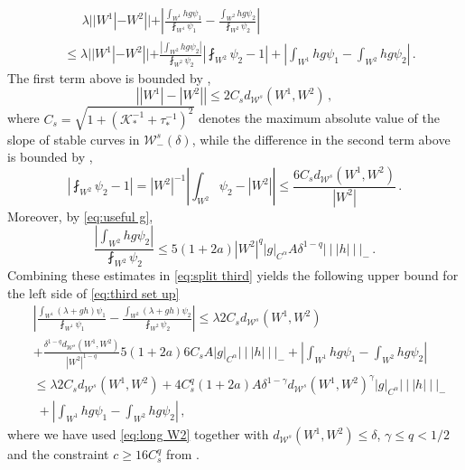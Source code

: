 \documentclass{amsart}
\numberwithin{equation}{section}
\newcommand\cK{{\mathcal K}}
\newcommand\cW{{\mathcal W}}
\newcommand{\tri}{{|\:\!\!|\:\!\!|}}
\begin{document}
\begin{equation}
\label{eq:split third}
\begin{split}
& \quad \; \, \lambda | |W^1| - W^2| | + \left| \frac{\int_{W^1} hg \psi_1}{\fint_{W^1} \psi_1} - \frac{ \int_{W^2} hg \psi_2}{ \fint_{W^2} \psi_2} \right| \\
& \le \lambda | |W^1| - W^2| | 
+ \frac{\left| \int_{W^2} hg \psi_2 \right| }{\fint_{W^2} \psi_2 } \left| \fint_{W^2} \psi_2 - 1 \right| 
+ \left| \int_{W^1} hg \psi_1 - \int_{W^2} hg \psi_2 \right| \, .
\end{split}
\end{equation}
The first term above is bounded by \cite[eq.~(5.8)]{DL22},
\begin{equation}
\label{eq:length diff}
\left| |W^1| - |W^2| \right| \le 2C_s d_{\cW^s}(W^1, W^2) \, ,
\end{equation}
where $C_s = \sqrt{1 + (\cK_*^{-1} + \tau_*^{-1})^2}$ denotes the maximum absolute value of the slope of stable curves in $\cW^s_-(\delta)$,
while the difference in the second term above is bounded by \cite[eq.~(5.10)]{DL22},
\begin{equation}
\label{eq:norm almost}
\left| \fint_{W^2} \psi_2 - 1\right| = |W^2|^{-1} \left| \int_{W^2} \psi_2 - |W^2| \right| 
\le \frac{6 C_s d_{\cW^s}(W^1, W^2)}{|W^2|}\, .
\end{equation}
Moreover, by \eqref{eq:useful g},
\[
\frac{\left| \int_{W^2} hg \psi_2 \right|}{\fint_{W^2} \psi_2 } \le 5 (1+2a) |W^2|^q |g|_{C^\alpha} A \delta^{1-q} \tri h \tri_- \, .
\]
Combining these estimates in \eqref{eq:split third} yields the following upper bound for the 
left side of \eqref{eq:third set up}
\begin{equation}
\label{eq:simpler split}
\begin{split}
& \left| \frac{\int_{W^1} (\lambda + gh) \psi_1}{\fint_{W^1} \psi_1} - \frac{\int_{W^2} (\lambda + gh) \psi_2}{\fint_{W^2} \psi_2} \right|
\le \lambda 2 C_s d_{\cW^s}(W^1, W^2) \\
& + \frac{\delta^{1-q} d_{\cW^s}(W^1, W^2)}{|W^2|^{1-q}} 5(1+2a) 6 C_s A |g|_{C^\alpha} \tri h \tri_-
+  \left| \int_{W^1} hg \psi_1 - \int_{W^2} hg \psi_2 \right| \\
& \le \lambda 2 C_s d_{\cW^s}(W^1, W^2)
+ 4C_s^q (1+2a) A \delta^{1-\gamma} d_{\cW^s}(W^1, W^2)^\gamma |g|_{C^\alpha} \tri h \tri_- \\
& \; + \left| \int_{W^1} hg \psi_1 - \int_{W^2} hg \psi_2 \right|  \, ,
\end{split}
\end{equation}
where we have used \eqref{eq:long W2} together with $d_{\cW^s}(W^1, W^2) \le \delta$,
$\gamma \le q < 1/2$ and the constraint $c \ge 16 C_s^q$ from \cite[eq.~(5.7)]{DL22}.
\end{document}
